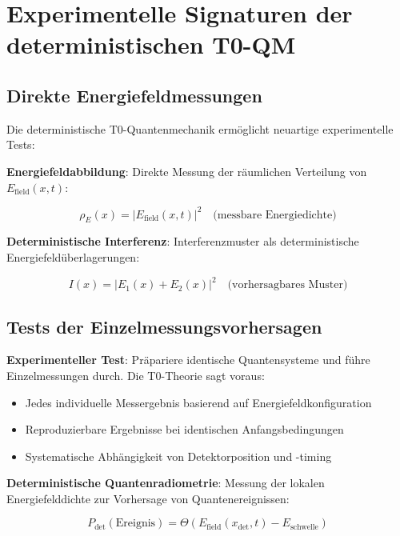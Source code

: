 \documentclass[12pt,a4paper]{article}
\theoremstyle{definition}
\theoremstyle{remark}
\begin{document}
\section{Experimentelle Signaturen der deterministischen T0-QM}

\subsection{Direkte Energiefeldmessungen}

Die deterministische T0-Quantenmechanik erm{\"o}glicht neuartige experimentelle Tests:

\textbf{Energiefeldabbildung}:
Direkte Messung der r{\"a}umlichen Verteilung von $E_{\text{field}}(x,t)$:

\begin{equation}
	\rho_E(x) = |E_{\text{field}}(x,t)|^2 \quad \text{(messbare Energiedichte)}
\end{equation}

\textbf{Deterministische Interferenz}:
Interferenzmuster als deterministische Energiefeld{\"u}berlagerungen:

\begin{equation}
	I(x) = |E_1(x) + E_2(x)|^2 \quad \text{(vorhersagbares Muster)}
\end{equation}

\subsection{Tests der Einzelmessungsvorhersagen}

\textbf{Experimenteller Test}: Pr{\"a}pariere identische Quantensysteme und f{\"u}hre Einzelmessungen durch. Die T0-Theorie sagt voraus:

\begin{itemize}
	\item Jedes individuelle Messergebnis basierend auf Energiefeldkonfiguration
	\item Reproduzierbare Ergebnisse bei identischen Anfangsbedingungen
	\item Systematische Abh{\"a}ngigkeit von Detektorposition und -timing
\end{itemize}

\textbf{Deterministische Quantenradiometrie}:
Messung der lokalen Energiefelddichte zur Vorhersage von Quantenereignissen:

\begin{equation}
	P_{\text{det}}(\text{Ereignis}) = \Theta\left(E_{\text{field}}(x_{\text{det}}, t) - E_{\text{schwelle}}\right)
\end{equation}
\end{document}
